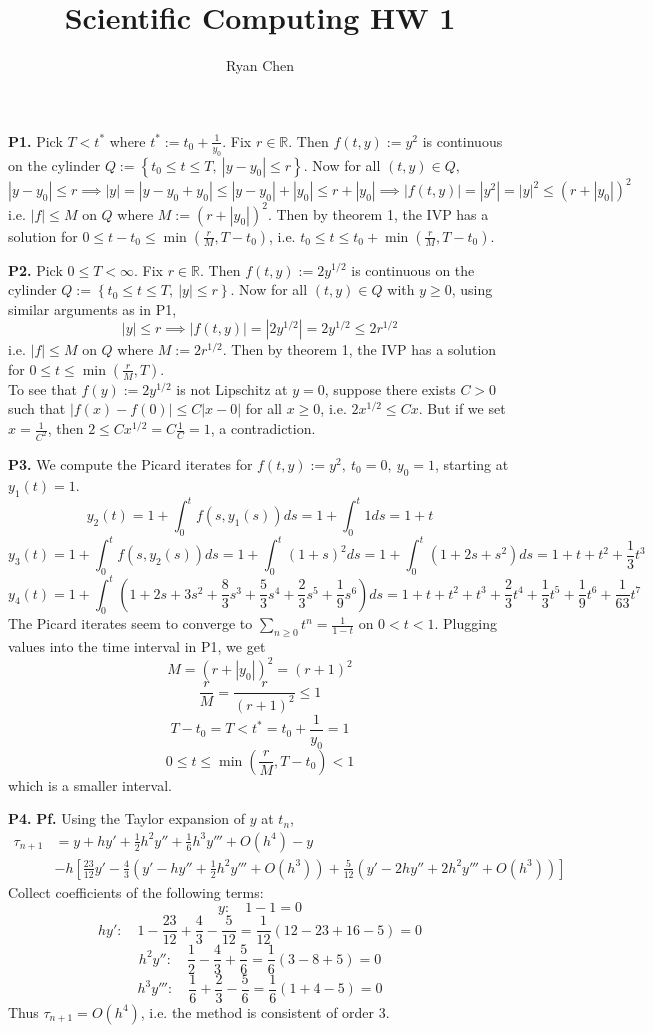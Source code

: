 \documentclass{article}
\title{Scientific Computing HW 1}
\author{Ryan Chen}
\def\mbb#1{\mathbb{#1}}
\def\tbf#1{\textbf{#1}}
\def\bR{\mbb{R}}
\newcommand{\br}[1]{\left(#1\right)}
\newcommand{\sbr}[1]{\left[#1\right]}
\newcommand{\brc}[1]{\left\{#1\right\}}
\newcommand{\pf}{\tbf{Pf. }}
\newcommand{\imp}{\implies}
\newcommand{\sep}[1][.5cm]{\vspace{#1}}
\begin{document}
\maketitle



\tbf{P1.} Pick $T<t^*$ where $t^*:=t_0+\frac{1}{y_0}$. Fix $r\in\bR$. Then $f(t,y):=y^2$ is continuous on the cylinder $Q:=\brc{t_0\le t\le T,~|y-y_0|\le r}$. Now for all $(t,y)\in Q$,
$$|y-y_0|\le r
\imp |y| = |y-y_0+y_0|
\le |y-y_0|+|y_0|
\le r+|y_0|
\imp |f(t,y)| = |y^2| = |y|^2 \le (r+|y_0|)^2$$
i.e. $|f|\le M$ on $Q$ where $M:=(r+|y_0|)^2$. Then by theorem 1, the IVP has a solution for $0\le t-t_0\le \min(\tfrac rM,T-t_0)$, i.e. $t_0 \le t\le t_0+\min(\frac rM,T-t_0)$.
\sep



\tbf{P2.} Pick $0\le T<\infty$. Fix $r\in\bR$. Then $f(t,y):=2y^{1/2}$ is continuous on the cylinder $Q:=\brc{t_0\le t\le T,~|y|\le r}$. Now for all $(t,y)\in Q$ with $y\ge0$, using similar arguments as in P1,
$$|y|\le r
\imp |f(t,y)| = |2y^{1/2}| = 2y^{1/2} \le 2r^{1/2}$$
i.e. $|f|\le M$ on $Q$ where $M:=2r^{1/2}$. Then by theorem 1, the IVP has a solution for $0\le t\le \min(\frac rM,T)$.\\

To see that $f(y):=2y^{1/2}$ is not Lipschitz at $y=0$, suppose there exists $C>0$ such that $|f(x)-f(0)|\le C|x-0|$ for all $x\ge0$, i.e. $2x^{1/2}\le Cx$. But if we set $x=\frac{1}{C^2}$, then $2\le Cx^{1/2}=C\frac1C=1$, a contradiction.
\sep



\tbf{P3.} We compute the Picard iterates for $f(t,y):=y^2,~t_0=0,~y_0=1$, starting at $y_1(t)=1$.
$$y_2(t) = 1 + \int_0^t f(s,y_1(s))ds = 1 + \int_0^t 1ds = 1 + t$$
$$y_3(t) = 1 + \int_0^t f(s,y_2(s))ds = 1 + \int_0^t (1+s)^2ds = 1 + \int_0^t (1+2s+s^2)ds = 1+t+t^2+\frac13t^3$$
$$y_4(t) = 1 + \int_0^t\br{1+2s+3s^2+\frac83s^3+\frac53s^4+\frac23s^5+\frac19s^6}ds = 1+t+t^2+t^3+\frac23t^4+\frac13t^5+\frac19t^6+\frac1{63}t^7$$
The Picard iterates seem to converge to $\sum_{n\ge0}t^n=\frac1{1-t}$ on $0<t<1$. Plugging values into the time interval in P1, we get
$$M = (r+|y_0|)^2 = (r+1)^2$$
$$\frac rM = \frac{r}{(r+1)^2} \le 1$$
$$T-t_0 = T < t^* = t_0+\frac{1}{y_0} = 1$$
$$0 \le t \le \min\br{\frac rM,T-t_0} < 1$$
which is a smaller interval.
\sep



\tbf{P4.} \pf Using the Taylor expansion of $y$ at $t_n$,
\begin{align*}
	\tau_{n+1} &= y + hy' + \frac12h^2y'' + \frac16h^3y''' + O(h^4) - y \\
	& - h\sbr{\frac{23}{12}y' - \frac43\br{y' - hy'' + \frac12h^2y''' + O(h^3)} + \frac{5}{12}\br{y' - 2hy'' + 2h^2y''' + O(h^3)}}
\end{align*}
Collect coefficients of the following terms:
$$y: \quad 1 - 1 = 0$$
$$hy': \quad 1 - \frac{23}{12} + \frac43 - \frac{5}{12} = \frac{1}{12}(12-23+16-5) = 0$$
$$h^2y'': \quad \frac12 - \frac43 + \frac56 = \frac16(3-8+5) = 0$$
$$h^3y''': \quad \frac16 + \frac23 - \frac56 = \frac16(1+4-5) = 0$$
Thus $\tau_{n+1}=O(h^4)$, i.e. the method is consistent of order 3.
\sep
\end{document}
